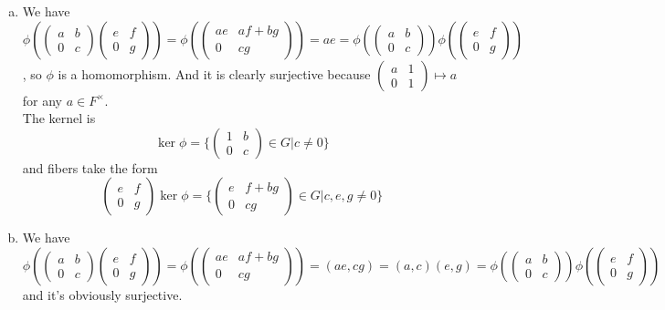 \documentclass{article}
\newcommand{\set}[1]{ \{ #1 \} }
\begin{document}
\subsubsection{}\label{ex1p11}
\begin{enumerate}[(a)]
\item 
We have $\phi(\begin{pmatrix}a & b\\ 0 & c\end{pmatrix}\begin{pmatrix}e & f\\ 0 & g\end{pmatrix}) = \phi(\begin{pmatrix}ae & af+bg\\ 0 & cg\end{pmatrix}) = ae = \phi(\begin{pmatrix}a & b\\ 0 & c\end{pmatrix})\phi(\begin{pmatrix}e & f\\ 0 & g\end{pmatrix})$, so $\phi$ is a homomorphism. And it is clearly surjective because $\begin{pmatrix}a & 1\\ 0 & 1\end{pmatrix} \mapsto a$ for any $a \in F^{\times}$.\\
The kernel is
\begin{equation}
\ker\phi = \set{\begin{pmatrix}1 & b\\0 & c\end{pmatrix} \in G \vert c \neq 0}
\end{equation}
and fibers take the form
\begin{equation}
\begin{pmatrix}e & f\\0 & g\end{pmatrix}\ker\phi =
\set{\begin{pmatrix}e & f+bg\\0 & cg\end{pmatrix} \in G \vert c,e,g \neq 0}
\end{equation}
\item We have $\phi(\begin{pmatrix}a & b\\ 0 & c\end{pmatrix}\begin{pmatrix}e & f\\ 0 & g\end{pmatrix}) = \phi(\begin{pmatrix}ae & af+bg\\ 0 & cg\end{pmatrix}) = (ae,cg) = (a,c)(e,g) = \phi(\begin{pmatrix}a & b\\ 0 & c\end{pmatrix})\phi(\begin{pmatrix}e & f\\ 0 & g\end{pmatrix})$ and it's obviously surjective.\\

\end{enumerate}
\end{document}
